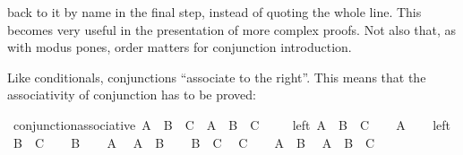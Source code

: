 \begin{isabellebody}
\begin{isamarkuptext}
back to it by name in the final step, instead of quoting the whole line. This becomes very useful in
the presentation of more complex proofs. Not also that, as with modus pones, order matters for
conjunction introduction.%
\end{isamarkuptext}\isamarkuptrue%
%
\begin{isamarkuptext}%
Like conditionals, conjunctions ``associate to the right''. This means that the associativity
of conjunction has to be proved:%
\end{isamarkuptext}\isamarkuptrue%
\isamarkupfalse%
\ conjunction{\isacharunderscore}associative{\isacharcolon}\ {\isachardoublequoteopen}A\ {\isasymand}\ B\ {\isasymand}\ C\ {\isasymlongleftrightarrow}\ {\isacharparenleft}A\ {\isasymand}\ B{\isacharparenright}\ {\isasymand}\ C{\isachardoublequoteclose}\ \isanewline
%
\isadelimproof
%
\endisadelimproof
%
\isatagproof
{}\isamarkupfalse%
\isanewline
\ \ \isamarkupfalse%
\ left{\isacharcolon}\ {\isachardoublequoteopen}A\ {\isasymand}\ B\ {\isasymand}\ C{\isachardoublequoteclose}\isanewline
\ \ \isamarkupfalse%
\ {\isachardoublequoteopen}A{\isachardoublequoteclose}\isacommand{{\isachardot}{\isachardot}}\isamarkupfalse%
\isanewline
\ \ \isamarkupfalse%
\ left\ \isamarkupfalse%
\ {\isachardoublequoteopen}B\ {\isasymand}\ C{\isachardoublequoteclose}\isacommand{{\isachardot}{\isachardot}}\isamarkupfalse%
\isanewline
\ \ \isamarkupfalse%
\ {\isachardoublequoteopen}B{\isachardoublequoteclose}\isacommand{{\isachardot}{\isachardot}}\isamarkupfalse%
\isanewline
\ \ \isamarkupfalse%
\ {\isacharbackquoteopen}A{\isacharbackquoteclose}\ \isamarkupfalse%
\ {\isachardoublequoteopen}A\ {\isasymand}\ B{\isachardoublequoteclose}\isacommand{{\isachardot}{\isachardot}}\isamarkupfalse%
\isanewline
\ \ \isamarkupfalse%
\ {\isacharbackquoteopen}B\ {\isasymand}\ C{\isacharbackquoteclose}\ \isamarkupfalse%
\ {\isachardoublequoteopen}C{\isachardoublequoteclose}\isacommand{{\isachardot}{\isachardot}}\isamarkupfalse%
\isanewline
\ \ \isamarkupfalse%
\ {\isacharbackquoteopen}A\ {\isasymand}\ B{\isacharbackquoteclose}\ \isamarkupfalse%
\ {\isachardoublequoteopen}{\isacharparenleft}A\ {\isasymand}\ B{\isacharparenright}\ {\isasymand}\ C{\isachardoublequoteclose}\isacommand{{\isachardot}{\isachardot}}\isamarkupfalse%
\isanewline
{}\isamarkupfalse%
\isanewline
\ \ \isamarkupfalse%

\end{isabellebody}
